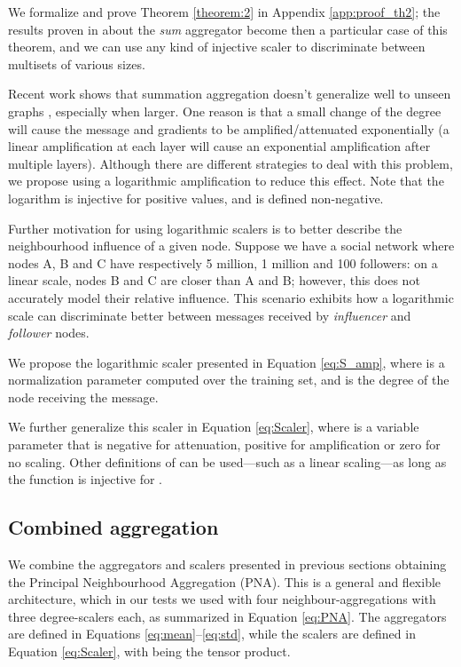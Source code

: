 \documentclass{article}
\begin{document}
We formalize and prove Theorem \ref{theorem:2} in Appendix \ref{app:proof_th2}; the results proven in \cite{xu2018gin} about the \textit{sum} aggregator become then a particular case of this theorem, and we can use any kind of injective scaler to discriminate between multisets of various sizes.

Recent work shows that summation aggregation doesn't generalize well to unseen graphs \cite{velickovic2019neural}, especially when larger. One reason is that a small change of the degree will cause the message and gradients to be amplified/attenuated exponentially (a linear amplification at each layer will cause an exponential amplification after multiple layers). Although there are different strategies to deal with this problem, we propose using a logarithmic amplification  to reduce this effect. Note that the logarithm is injective for positive values, and  is defined non-negative.  

Further motivation for using logarithmic scalers is to better describe the neighbourhood influence of a given node. Suppose we have a social network where nodes A, B and C have respectively 5 million, 1 million and 100 followers: on a linear scale, nodes B and C are closer than A and B; however, this does not accurately model their relative influence. This scenario exhibits how a logarithmic scale can discriminate better between messages received by \textit{influencer} and \textit{follower} nodes. 

We propose the logarithmic scaler  presented in Equation \ref{eq:S_amp}, where  is a normalization parameter computed over the training set, and  is the degree of the node receiving the message.


We further generalize this scaler in Equation \ref{eq:Scaler}, where  is a variable parameter that is negative for attenuation, positive for amplification or zero for no scaling. Other definitions of  can be used---such as a linear scaling---as long as the function is injective for . 


\subsection{Combined aggregation}

We combine the aggregators and scalers presented in previous sections obtaining the Principal Neighbourhood Aggregation (PNA). This is a general and flexible architecture, which in our tests we used with four neighbour-aggregations with three degree-scalers each, as summarized in Equation \ref{eq:PNA}. The aggregators are defined in Equations \ref{eq:mean}--\ref{eq:std}, while the scalers are defined in Equation \ref{eq:Scaler}, with  being the tensor product.
\end{document}
